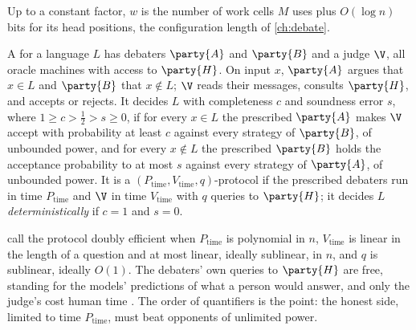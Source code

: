 \begin{refsection}
Up to a constant factor, $w$ is the number of work cells $M$ uses plus $O(\log n)$ bits for its head positions, the configuration length of \cref{ch:debate}.

\begin{definition}\label{def:efficientdebate:protocol}
A  for a language $L$ has debaters $\party{A}$ and $\party{B}$ and a judge $\V$, all oracle machines with access to $\party{H}$. On input $x$, $\party{A}$ argues that $x\in L$ and $\party{B}$ that $x\notin L$; $\V$ reads their messages, consults $\party{H}$, and accepts or rejects. It decides $L$ with completeness $c$ and soundness error $s$, where $1\ge c>\frac12>s\ge0$, if for every $x\in L$ the prescribed $\party{A}$ makes $\V$ accept with probability at least $c$ against every strategy of $\party{B}$, of unbounded power, and for every $x\notin L$ the prescribed $\party{B}$ holds the acceptance probability to at most $s$ against every strategy of $\party{A}$, of unbounded power. It is a $(P_{\mathrm{time}},V_{\mathrm{time}},q)$-protocol if the prescribed debaters run in time $P_{\mathrm{time}}$ and $\V$ in time $V_{\mathrm{time}}$ with $q$ queries to $\party{H}$; it decides $L$ \emph{deterministically} if $c=1$ and $s=0$.
\end{definition}

\Textcite{BrownCohenEtAl2024} call the protocol doubly efficient when $P_{\mathrm{time}}$ is polynomial in $n$, $V_{\mathrm{time}}$ is linear in the length of a question and at most linear, ideally sublinear, in $n$, and $q$ is sublinear, ideally $O(1)$. The debaters' own queries to $\party{H}$ are free, standing for the models' predictions of what a person would answer, and only the judge's cost human time \parencite[Section~4.2]{BrownCohenEtAl2024}. The order of quantifiers is the point: the honest side, limited to time $P_{\mathrm{time}}$, must beat opponents of unlimited power.


\end{refsection}
